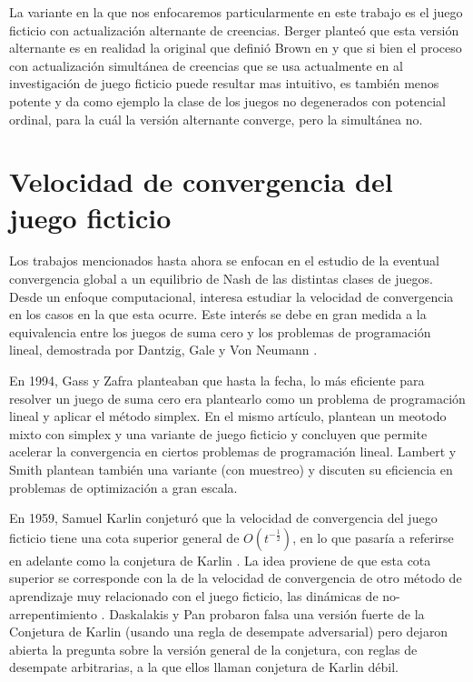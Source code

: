 La variante en la que nos enfocaremos particularmente en este trabajo es el juego ficticio con actualización alternante de creencias. Berger \cite{browns:original} planteó que esta versión alternante es en realidad la original que definió Brown en \cite{brown:1951} y que si bien el proceso con actualización simultánea de creencias que se usa actualmente en al investigación de juego ficticio puede resultar mas intuitivo, es también menos potente y da como ejemplo la clase de los juegos no degenerados con potencial ordinal, para la cuál la versión alternante converge, pero la simultánea no.

\section{Velocidad de convergencia del juego ficticio}

Los trabajos mencionados hasta ahora se enfocan en el estudio de la eventual convergencia global a un equilibrio de Nash de las distintas clases de juegos. Desde un enfoque computacional, interesa estudiar la velocidad de convergencia en los casos en la que esta ocurre. Este interés se debe en gran medida a la equivalencia entre los juegos de suma cero y los problemas de programación lineal, demostrada por Dantzig, Gale y Von Neumann \cite{fplp:equiv} \cite{programming:game:equivalence}.

En 1994, Gass y Zafra \cite{modified:fp:linear} planteaban que hasta la fecha, lo más eficiente para resolver un juego de suma cero era plantearlo como un problema de programación lineal y aplicar el método simplex. En el mismo artículo, plantean un meotodo mixto con simplex y una variante de juego ficticio y concluyen que permite acelerar la convergencia en ciertos problemas de programación lineal. Lambert y Smith \cite{aproach:large:scale} plantean también una variante (con muestreo) y discuten su eficiencia en problemas de optimización a gran escala.

En 1959, Samuel Karlin conjeturó que la velocidad de convergencia del juego ficticio tiene una cota superior general de $O(t^{-\frac{1}{2}})$, en lo que pasaría a referirse en adelante como la conjetura de Karlin \cite{karlin:conjecture}. La idea proviene de que esta cota superior se corresponde con la de la velocidad de convergencia de otro método de aprendizaje muy relacionado con el juego ficticio, las dinámicas de no-arrepentimiento \cite{no:regret} \cite{no:regret:2}. Daskalakis y Pan \cite{counter:karlin:strong} probaron falsa una versión fuerte de la Conjetura de Karlin (usando una regla de desempate adversarial) pero dejaron abierta la pregunta sobre la versión general de la conjetura, con reglas de desempate arbitrarias, a la que ellos llaman conjetura de Karlin débil.

